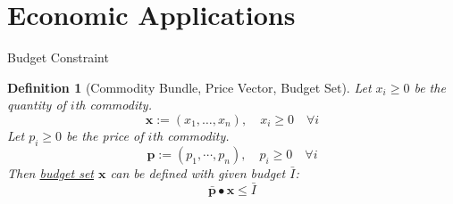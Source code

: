 \documentclass[a4paper,11pt]{article}
\newtheorem{defn}{Definition}
\begin{document}
\section{Economic Applications} %
\label{sec:economic_applications}
\begin{frame}[t]{Budget Constraint}
	\begin{defn}
		[Commodity Bundle, Price Vector, Budget Set]
		Let $x_i\ge 0$ be the quantity of $i$th commodity. 
		\[
			\mathbf{x}:=(x_1,\dots,x_n),\quad x_i \ge 0\quad\forall i \tag{Commodity Bundle}
		\]
		Let $p_i\ge 0$ be the price of $i$th commodity. \[
			\mathbf{p}:=(p_1,\cdots,p_n),\quad p_i \ge 0\quad\forall i \tag{Price Vector}
		\]
		Then \uline{budget set} $\mathbf{x}$ can be defined with given budget $\bar{I}$:\[
			\bar{\mathbf{p}}\bullet{\mathbf{x}}\le \bar I \tag{Budget Constraint}
		\]
	\end{defn}
\end{frame}
\end{document}
